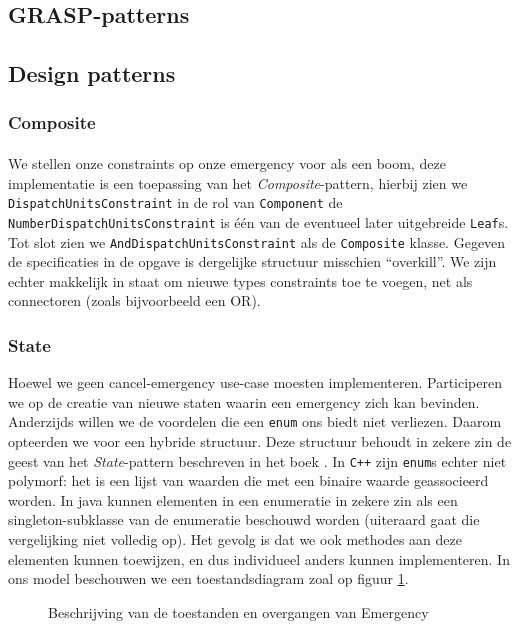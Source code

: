 \subsection{GRASP-patterns}
\subsection{Design patterns}
\subsubsection{Composite}
\paragraph{}
We stellen onze constraints op onze emergency voor als een boom, deze implementatie is een toepassing van het \textit{Composite}-pattern, hierbij zien we \texttt{Dispatch\-Units\-Constraint} in de rol van \texttt{Component} de \texttt{Number\-Dispatch\-Units\-Constraint} is \'e\'en van de eventueel later uitgebreide \texttt{Leaf}s. Tot slot zien we \texttt{And\-Dispatch\-Units\-Constraint} als de \texttt{Composite} klasse. Gegeven de specificaties in de opgave is dergelijke structuur misschien ``overkill''. We zijn echter makkelijk in staat om nieuwe types constraints toe te voegen, net als connectoren (zoals bijvoorbeeld een OR).
\subsubsection{State}
Hoewel we geen cancel-emergency use-case moesten implementeren. Participeren we op de creatie van nieuwe staten waarin een emergency zich kan bevinden. Anderzijds willen we de voordelen die een \verb+enum+ ons biedt niet verliezen. Daarom opteerden we voor een hybride structuur. Deze structuur behoudt in zekere zin de geest van het \textit{State}-pattern beschreven in het boek \cite{book:designpatterns}. In \verb#C++# zijn \verb+enum+s echter niet polymorf: het is een lijst van waarden die met een binaire waarde geassocieerd worden. In java kunnen elementen in een enumeratie in zekere zin als een singleton-subklasse van de enumeratie beschouwd worden (uiteraard gaat die vergelijking niet volledig op). Het gevolg is dat we ook methodes aan deze elementen kunnen toewijzen, en dus individueel anders kunnen implementeren. In ons model beschouwen we een toestandsdiagram zoal op figuur \ref{fig:stateDiagramEmergency}.
\newcommand{\classComponent}{\umlClass{DispatchUnitsConstraint}{
\hline
areValidDispatchUnits(units:List<Unit>, used:boolean[]):boolean
}}
\begin{figure}
\centering
{}
\caption{Beschrijving van de toestanden en overgangen van Emergency}
\label{fig:stateDiagramEmergency}
\end{figure}
